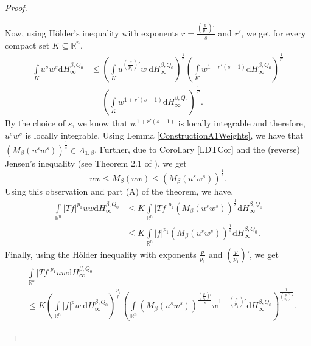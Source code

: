 \documentclass{amsart}
\numberwithin{theorem}{section}
\numberwithin{equation}{section}
\begin{document}
\begin{proof}
\begin{enumerate}
				Now, using H\"{o}lder's inequality with exponents $r = \frac{\left( \frac{p}{p_1} \right)'}{s}$ and $r'$, we get for every compact set $K \subseteq \mathbb{R}^n$,
				\begin{align*}
					\int\limits_{K} u^sw^s \mathrm{d}H^{\beta, Q_0}_{\infty} &\leq \left( \int\limits_{K} u^{\left( \frac{p}{p_1} \right)'} w \ \mathrm{d}H^{\beta, Q_0}_{\infty} \right)^{\frac{1}{r}} \left( \int\limits_{K} w^{1 + r' \left( s - 1 \right)} \mathrm{d}H^{\beta, Q_0}_{\infty} \right)^{\frac{1}{r'}} \\
					&= \left( \int\limits_{K} w^{1 + r' \left( s - 1 \right)} \mathrm{d}H^{\beta, Q_0}_{\infty} \right)^{\frac{1}{r'}}.
				\end{align*}
				By the choice of $s$, we know that $w^{1 + r' \left( s - 1 \right)}$ is locally integrable and therefore, $u^sw^s$ is locally integrable. Using Lemma \ref{ConstructionA1Weights}, we have that $\left( M_{\beta} \left( u^sw^s \right) \right)^{\frac{1}{s}} \in A_{1, \beta}$. Further, due to Corollary \ref{LDTCor} and the (reverse) Jensen's inequality (see Theorem 2.1 of \cite{ZhangJensen}), we get
				$$uw \leq M_{\beta}\left( uw \right) \leq \left( M_{\beta}\left( u^sw^s \right) \right)^{\frac{1}{s}}.$$
				Using this observation and part (A) of the theorem, we have,
				\begin{align*}
					\int\limits_{\mathbb{R}^n} \left| Tf \right|^{p_1} uw \mathrm{d}H^{\beta, Q_0}_{\infty} &\leq K \int\limits_{\mathbb{R}^n} \left| Tf \right|^{p_1} \left( M_{\beta} \left( u^sw^s \right) \right)^{\frac{1}{s}} \mathrm{d}H^{\beta, Q_0}_{\infty} \\
					&\leq K \int\limits_{\mathbb{R}^n} \left| f \right|^{p_1} \left( M_{\beta}\left( u^sw^s \right) \right)^{\frac{1}{s}} \mathrm{d}H^{\beta, Q_0}_{\infty}.
				\end{align*}
				Finally, using the H\"{o}lder inequality with exponents $\frac{p}{p_1}$ and $\left( \frac{p}{p_1} \right)'$, we get
				\begin{align*}
					&\int\limits_{\mathbb{R}^n} \left| Tf \right|^{p_1} uw \mathrm{d}H^{\beta, Q_0}_{\infty} \\
					&\leq K \left( \int\limits_{\mathbb{R}^n} \left| f \right|^{p} w \ \mathrm{d}H^{\beta, Q_0}_{\infty} \right)^{\frac{p_1}{p}} \left( \int\limits_{\mathbb{R}^n} \left( M_{\beta} \left( u^sw^s \right) \right)^{\frac{\left( \frac{p}{p_1} \right)'}{s}} w^{1 - \left( \frac{p}{p_1} \right)'} \mathrm{d}H^{\beta, Q_0}_{\infty} \right)^{\frac{1}{\left( \frac{p}{p_1} \right)'}}.
				\end{align*}

\end{enumerate}
\end{proof}
\end{document}
